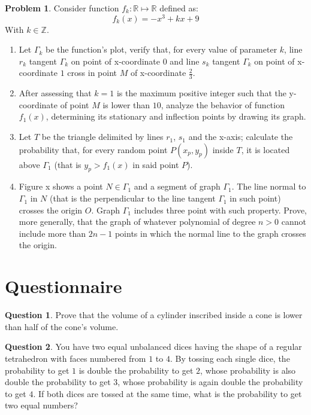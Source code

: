 \documentclass[a4paper,12pt,reqno]{amsart}
\theoremstyle{definition}
\newtheorem{problem}{Problem}
\newtheorem{quest}{Question}
\begin{document}
\begin{problem}
Consider function $f_k: \mathbb{R} \mapsto \mathbb{R}$ defined as:
\begin{equation}
f_k(x)=-x^3+kx+9
\end{equation}
With $k\in\mathbb{Z}$.
\begin{enumerate}
\item Let $\Gamma_k$ be the function's plot, verify that, for every value of parameter $k$, line $r_k$ tangent
$\Gamma_k$ on point of x-coordinate $0$ and line $s_k$ tangent $\Gamma_k$ on point of x-coordinate $1$ cross
in point $M$ of x-coordinate $\frac{2}{3}$.
\item After assessing that $k=1$ is the maximum positive integer such that the y-coordinate of point $M$ is
lower than $10$, analyze the behavior of function $f_1(x)$, determining its stationary and inflection points by
drawing its graph.
\item Let $T$ be the triangle delimited by lines $r_1$, $s_1$ and the x-axis; calculate the probability that,
for every random point $P(x_p,y_p)$ inside $T$, it is located above $\Gamma_1$ (that is $y_p > f_1(x)$ in said
point $P$).
\item Figure x shows a point $N \in \Gamma_1$ and a segment of graph $\Gamma_1$. The line normal to
$\Gamma_1$ in $N$ (that is the perpendicular to the line tangent $\Gamma_1$ in such point) crosses the
origin $O$. Graph $\Gamma_1$ includes three point with such property. Prove, more generally, that the graph
of whatever polynomial of degree $n>0$ cannot include more than $2n-1$ points in which the normal line to the
graph crosses the origin.
\end{enumerate}
\end{problem}

\section{Questionnaire}

\begin{quest}
Prove that the volume of a cylinder inscribed inside a cone is lower than half of the cone's volume.
\end{quest}

\begin{quest}
You have two equal unbalanced dices having the shape of a regular tetrahedron with faces numbered from
$1$ to $4$. By tossing each single dice, the probability to get $1$ is double the probability to get $2$, whose
probability is also double the probability to get $3$, whose probability is again double the probability to
get $4$. If both dices are tossed at the same time, what is the probability to get two equal numbers?
\end{quest}
\end{document}
